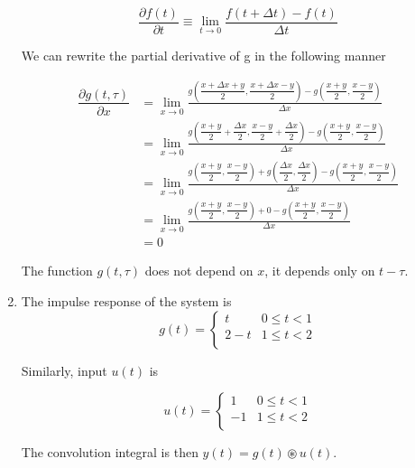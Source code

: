 \documentclass[a4paper,12pt]{article}
\begin{document}
\begin{enumerate}
\begin{equation*}
  \dfrac{\partial f(t)}{\partial t} \equiv \lim_{t \rightarrow 0} \frac{f(t+\Delta t) - f(t)}{\Delta t}
\end{equation*}

We can rewrite the partial derivative of g in the following manner

\begin{align*}
  \dfrac{\partial g(t,\tau)}{\partial x} &= \lim_{x \rightarrow 0} \frac{  g(\dfrac{x + \Delta x +y}{2}, \dfrac{x + \Delta x-y}{2}) -  g(\dfrac{x+y}{2}, \dfrac{x-y}{2})}{\Delta x}\\
  &= \lim_{x \rightarrow 0} \frac{  g(\dfrac{x+y}{2} + \dfrac{\Delta x}{2}, \dfrac{x-y}{2} + \dfrac{\Delta x}{2}) -  g(\dfrac{x+y}{2}, \dfrac{x-y}{2})}{\Delta x}\\
  &= \lim_{x \rightarrow 0} \frac{g(\dfrac{x+y}{2}, \dfrac{x-y}{2}) + g(\dfrac{\Delta x}{2}, \dfrac{\Delta x}{2}) -  g(\dfrac{x+y}{2}, \dfrac{x-y}{2})}{\Delta x}\\
  &= \lim_{x \rightarrow 0} \frac{  g(\dfrac{x+y}{2}, \dfrac{x-y}{2}) + 0 -  g(\dfrac{x+y}{2}, \dfrac{x-y}{2})}{\Delta x}\\
  &= 0
\end{align*}

The function $g(t, \tau)$ does not depend on $x$, it depends only on $t-\tau$.

\item The impulse response of the system is
\begin{equation*}
 g(t) = \begin{cases}
         t & 0 \leq t < 1\\
         2 - t & 1 \leq t < 2\\
        \end{cases}
\end{equation*}

Similarly, input $u(t)$ is

\begin{equation*}
u(t) = \begin{cases}
        1 & 0 \leq t < 1 \\
        -1 & 1 \leq t < 2 \\
       \end{cases}
\end{equation*}

The convolution integral is then $y (t) = g(t)\circledast u(t)$.


\end{enumerate}
\end{document}
